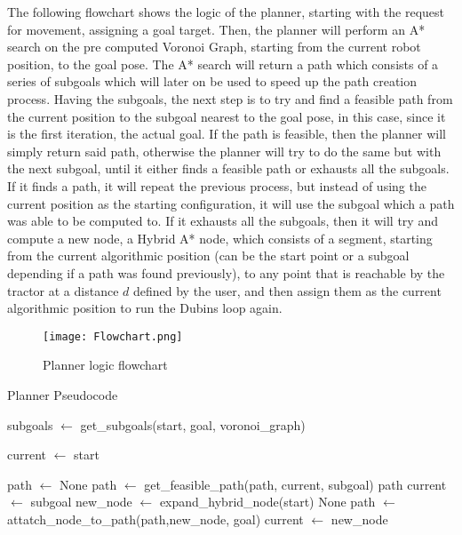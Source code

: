 The following flowchart shows the logic of the planner, starting with 
the request for movement, assigning a goal target. Then, the planner will 
perform an A* search on the pre computed Voronoi Graph, starting from the current robot 
position, to the goal pose. The A* search will return a path which consists 
of a series of subgoals which will later on be used to speed up the 
path creation process. Having the subgoals, the next step is to try and 
find a feasible path from the current position to the subgoal nearest to 
the goal pose, in this case, since it is the first iteration, the actual goal. 
If the path is feasible, then the planner will simply return said path, otherwise
 the planner will try to do the same but with the next subgoal, until it either finds 
a feasible path or exhausts all the subgoals. If it finds a path, it will 
repeat the previous process, but instead of using the current position as the 
starting configuration, it will use the subgoal which a path was able to be 
computed to. If it exhausts all the subgoals, then it will try and compute a new node, 
a Hybrid A* node, which consists of a segment, starting from the current algorithmic position 
(can be the start point or a subgoal depending if a path was found previously), to any point 
that is reachable by the tractor at a distance $d$ defined by the user, and then assign them as the 
current algorithmic position to run the Dubins loop again.
\begin{figure}[h]
    \centering
    \texttt{[image: Flowchart.png]}
    \caption{Planner logic flowchart}
\end{figure}
\clearpage

\begin{algorithm}
\caption{Planner Pseudocode}
\label{alg:planner}
\begin{algorithmic}[1]
    \State subgoals $\gets$ get\_subgoals(start, goal, voronoi\_graph)

    \State current $\gets$ start

    \State path $\gets$ None
        \State path $\gets$ get\_feasible\_path(path, current, subgoal)
                \State \Return path
            \Else
                \State current $\gets$ subgoal
            \EndIf
        \EndIf
    \EndFor
        \State new\_node $\gets$ expand\_hybrid\_node(start)
            \State \Return None
        \EndIf
        \State path $\gets$ attatch\_node\_to\_path(path,new\_node, goal)
        \State current $\gets$ new\_node
    \EndWhile
\EndFunction
\end{algorithmic}
\end{algorithm}

